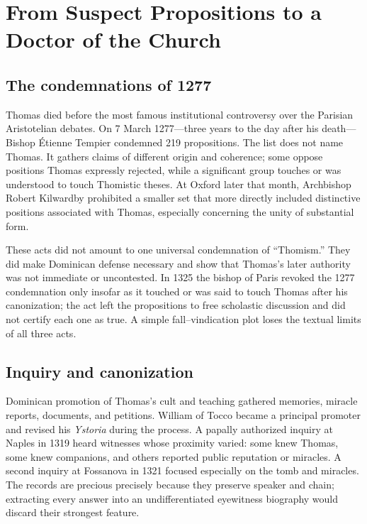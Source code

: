 \section{From Suspect Propositions to a Doctor of the Church}

\subsection{The condemnations of 1277}

Thomas died before the most famous institutional controversy over the Parisian
Aristotelian debates.  On 7 March 1277---three years to the day after his
death---Bishop Étienne Tempier condemned 219 propositions.  The list does not
name Thomas.  It gathers claims of different origin and coherence; some oppose
positions Thomas expressly rejected, while a significant group touches or was
understood to touch Thomistic theses.  At Oxford later that month, Archbishop
Robert Kilwardby prohibited a smaller set that more directly included
distinctive positions associated with Thomas, especially concerning the unity
of substantial form.

These acts did not amount to one universal condemnation of ``Thomism.''  They
did make Dominican defense necessary and show that Thomas's later authority was
not immediate or uncontested.  In 1325 the bishop of Paris revoked the 1277
condemnation only insofar as it touched or was said to touch Thomas after his
canonization; the act left the propositions to free scholastic discussion and
did not certify each one as true.  A simple fall--vindication plot loses the
textual limits of all three acts.

\subsection{Inquiry and canonization}

Dominican promotion of Thomas's cult and teaching gathered memories, miracle
reports, documents, and petitions.  William of Tocco became a principal
promoter and revised his \emph{Ystoria} during the process.  A papally
authorized inquiry at Naples in 1319 heard witnesses whose proximity varied:
some knew Thomas, some knew companions, and others reported public reputation
or miracles.  A second inquiry at Fossanova in 1321 focused especially on the
tomb and miracles.  The records are precious precisely because they preserve
speaker and chain; extracting every answer into an undifferentiated eyewitness
biography would discard their strongest feature.

